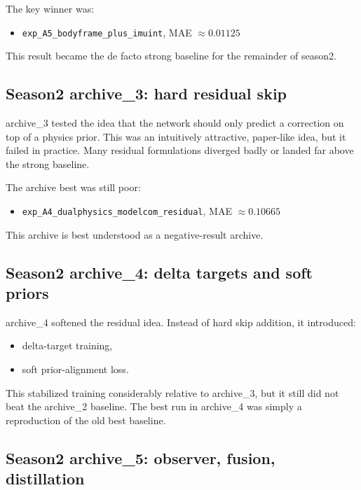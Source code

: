 \documentclass[11pt,a4paper]{article}
\begin{document}
The key winner was:

\begin{itemize}
\item \texttt{exp\_A5\_bodyframe\_plus\_imuint}, MAE \(\approx 0.01125\)
\end{itemize}

This result became the de facto strong baseline for the remainder of season2.

\subsection{Season2 archive\_3: hard residual skip}

archive\_3 tested the idea that the network should only predict a correction on top of a physics prior. This was an intuitively attractive, paper-like idea, but it failed in practice. Many residual formulations diverged badly or landed far above the strong baseline.

The archive best was still poor:

\begin{itemize}
\item \texttt{exp\_A4\_dualphysics\_modelcom\_residual}, MAE \(\approx 0.10665\)
\end{itemize}

This archive is best understood as a negative-result archive.

\subsection{Season2 archive\_4: delta targets and soft priors}

archive\_4 softened the residual idea. Instead of hard skip addition, it introduced:

\begin{itemize}
\item delta-target training,
\item soft prior-alignment loss.
\end{itemize}

This stabilized training considerably relative to archive\_3, but it still did not beat the archive\_2 baseline. The best run in archive\_4 was simply a reproduction of the old best baseline.

\subsection{Season2 archive\_5: observer, fusion, distillation}
\end{document}
